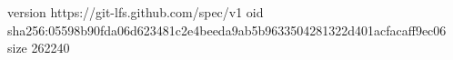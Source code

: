 version https://git-lfs.github.com/spec/v1
oid sha256:05598b90fda06d623481c2e4beeda9ab5b9633504281322d401acfacaff9ec06
size 262240
